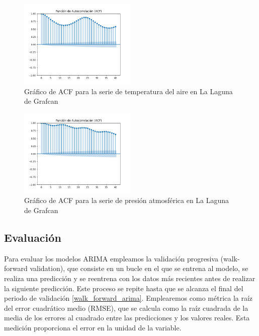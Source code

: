 \begin{figure}[H]
    \centering
    \includegraphics[width=0.5\textwidth]{images/arima_acf_temp.png}
    \caption{Gráfico de ACF para la serie de temperatura del aire en La Laguna de Grafcan}
    \label{acf_arima_temp}
\end{figure}

\begin{figure}[H]
    \centering
    \includegraphics[width=0.5\textwidth]{images/arima_acf_pres.png}
    \caption{Gráfico de ACF para la serie de presión atmosférica en La Laguna de Grafcan}
    \label{acf_arima_pres}
\end{figure}

\subsection{Evaluación}
Para evaluar los modelos ARIMA empleamos la validación progresiva (walk-forward validation), que consiste en un bucle en el que se entrena al modelo, se realiza una predicción y se reentrena con los datos más recientes
antes de realizar la siguiente predicción. Este proceso se repite hasta que se alcanza el final del periodo de validación \ref{walk_forward_arima}. Emplearemos como métrica la raíz del error cuadrático medio (RMSE), 
que se calcula como la raíz cuadrada de la media de los errores al cuadrado entre las predicciones y los valores reales. Esta medición proporciona el error en la unidad de la variable.

